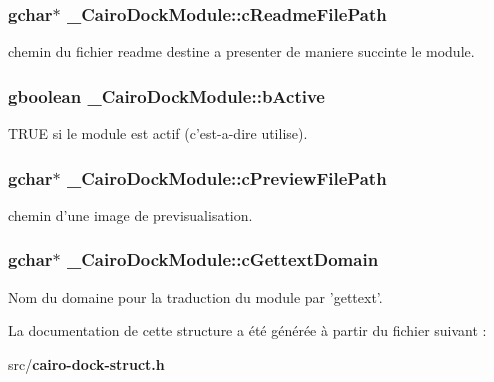 \subsubsection{\setlength{\rightskip}{0pt plus 5cm}gchar$\ast$ {\bf \_\-CairoDockModule::cReadmeFilePath}}\label{struct__CairoDockModule_cdf4b9dbd4f8d9b5e5215f55d39416f1}


chemin du fichier readme destine a presenter de maniere succinte le module. 

\subsubsection{\setlength{\rightskip}{0pt plus 5cm}gboolean {\bf \_\-CairoDockModule::bActive}}\label{struct__CairoDockModule_a9c10078fd18f333ce8bd53f3e8a890a}


TRUE si le module est actif (c'est-a-dire utilise). 

\subsubsection{\setlength{\rightskip}{0pt plus 5cm}gchar$\ast$ {\bf \_\-CairoDockModule::cPreviewFilePath}}\label{struct__CairoDockModule_4c73513eab85ce14efa704c44dc44371}


chemin d'une image de previsualisation. 

\subsubsection{\setlength{\rightskip}{0pt plus 5cm}gchar$\ast$ {\bf \_\-CairoDockModule::cGettextDomain}}\label{struct__CairoDockModule_989b8d518a419666030ad379da01db7a}


Nom du domaine pour la traduction du module par 'gettext'. 



La documentation de cette structure a été générée à partir du fichier suivant :\begin{CompactItemize}
\item 
src/{\bf cairo-dock-struct.h}\end{CompactItemize}

